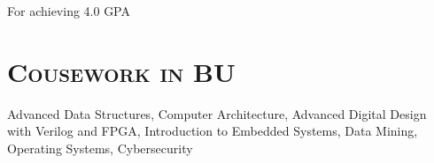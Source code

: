 \begin{resume}
	
	
	
	\begin{position}
		For achieving 4.0 GPA
	\end{position}
	
	
	
	\section{\textsc{Cousework in BU}}
	
	Advanced Data Structures, Computer Architecture, Advanced Digital Design with
	Verilog and FPGA, Introduction to Embedded Systems, Data Mining, Operating
  Systems, Cybersecurity
	
	
	
	
	
	
	
	

\end{resume}

